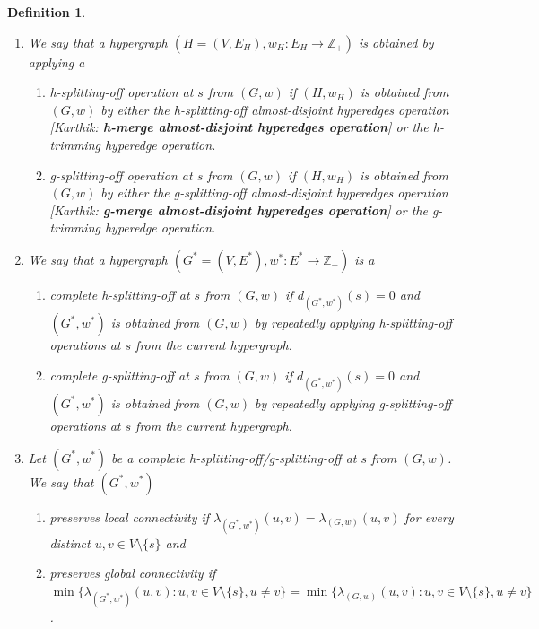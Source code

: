 \documentclass{article}
\newtheorem{definition}{Definition}[section]
\newcommand{\knote}[1]{{\color{red}[{\tiny Karthik: \bf #1}]\marginpar{\color{red}*}}}
\providecommand{\Z}{\mathbb{Z}}
\begin{document}
\begin{definition}
\begin{enumerate}
        
       \item We say that a hypergraph $(H=(V, E_H), w_H: E_H\rightarrow \Z_+)$ is obtained by applying a 
        \begin{enumerate}
            \item \emph{h-splitting-off operation at $s$ from $(G, w)$} if $(H, w_H)$ is obtained from $(G, w)$ by either the h-splitting-off almost-disjoint hyperedges operation \knote{h-merge almost-disjoint hyperedges operation} or the h-trimming hyperedge operation. 
            \item \emph{g-splitting-off operation at $s$ from $(G, w)$} if $(H, w_H)$ is obtained from $(G, w)$ by either the g-splitting-off almost-disjoint hyperedges operation \knote{g-merge almost-disjoint hyperedges operation} or the g-trimming hyperedge operation. 
        \end{enumerate}
        
        \item We say that a hypergraph $(G^*=(V, E^*), w^*: E^*\rightarrow \Z_+)$ is a 
        \begin{enumerate}
            \item \emph{complete h-splitting-off at $s$ from $(G, w)$} if $d_{(G^*, w^*)}(s) = 0$ and $(G^*, w^*)$ is obtained from $(G, w)$ by repeatedly applying h-splitting-off operations at $s$ from the current hypergraph. 
            \item \emph{complete g-splitting-off at $s$ from $(G, w)$} if $d_{(G^*, w^*)}(s) = 0$ and $(G^*, w^*)$ is obtained from $(G, w)$ by repeatedly applying g-splitting-off operations at $s$ from the current hypergraph. 
        \end{enumerate}

        \item Let $(G^*, w^*)$ be a complete h-splitting-off/g-splitting-off at $s$ from $(G, w)$. We say that $(G^*, w^*)$ 
        \begin{enumerate}
            \item 
            preserves local connectivity if $\lambda_{(G^*, w^*)}(u, v)=\lambda_{(G, w)}(u, v)$ for every distinct $u, v\in V\setminus\{s\}$ and 
            
            \item preserves global connectivity if \\
            $\min\{\lambda_{(G^*, w^*)}(u, v): u, v\in V\setminus \{s\}, u \neq v\}=\min\{\lambda_{(G, w)}(u, v): u, v\in V\setminus \{s\}, u \neq v\}$. 
            
        \end{enumerate}
    \end{enumerate}
\end{definition}
\fi
\end{document}
